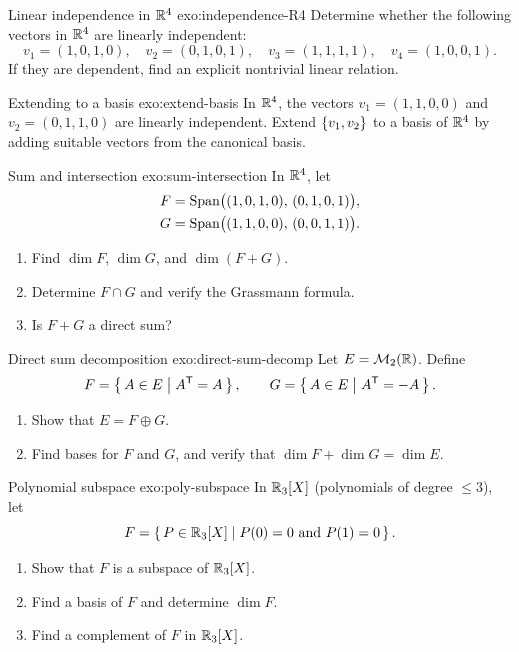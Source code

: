 \begin{exercise}{Linear independence in ${\mathbb{R}}^4$ \basic}{exo:independence-R4}
Determine whether the following vectors in ${\mathbb{R}}^4$ are linearly
independent:
\[
  v_1 = (1,0,1,0),\quad v_2 = (0,1,0,1),\quad v_3 = (1,1,1,1),\quad
  v_4 = (1,0,0,1).
\]
If they are dependent, find an explicit nontrivial linear relation.
\end{exercise}

\begin{exercise}{Extending to a basis \intermediate}{exo:extend-basis}
In ${\mathbb{R}}^4$, the vectors $v_1=(1,1,0,0)$ and $v_2=(0,1,1,0)$ are linearly
independent. Extend $\left\{v_1,v_2\right\}$ to a basis of ${\mathbb{R}}^4$ by adding
suitable vectors from the canonical basis.
\end{exercise}

\begin{exercise}{Sum and intersection \intermediate}{exo:sum-intersection}
In ${\mathbb{R}}^4$, let
\begin{align*}
  F &= \operatorname{Span}\bigl((1,0,1,0),\,(0,1,0,1)\bigr), \\
  G &= \operatorname{Span}\bigl((1,1,0,0),\,(0,0,1,1)\bigr).
\end{align*}
\begin{enumerate}[label=(\alph*)]
  \item Find $\dim F$, $\dim G$, and $\dim(F+G)$.
  \item Determine $F\cap G$ and verify the Grassmann formula.
  \item Is $F+G$ a direct sum?
\end{enumerate}
\end{exercise}

\begin{exercise}{Direct sum decomposition \intermediate}{exo:direct-sum-decomp}
Let $E = \mathcal{M}_2({\mathbb{R}})$. Define
\[
  F = \left\{\,A\in E\;\middle|\;{A}^{\mathsf{T}}=A\,\right\}, \qquad
  G = \left\{\,A\in E\;\middle|\;{A}^{\mathsf{T}}=-A\,\right\}.
\]
\begin{enumerate}[label=(\alph*)]
  \item Show that $E = F\oplus G$.
  \item Find bases for $F$ and $G$, and verify that
    $\dim F+\dim G=\dim E$.
\end{enumerate}
\end{exercise}

\begin{exercise}{Polynomial subspace \intermediate}{exo:poly-subspace}
In ${\mathbb{R}}_3[X]$ (polynomials of degree $\leq 3$), let
\[
  F = \left\{\,P\in{\mathbb{R}}_3[X]\;\middle|\;P(0)=0 \text{ and } P(1)=0\,\right\}.
\]
\begin{enumerate}[label=(\alph*)]
  \item Show that $F$ is a subspace of ${\mathbb{R}}_3[X]$.
  \item Find a basis of $F$ and determine $\dim F$.
  \item Find a complement of $F$ in ${\mathbb{R}}_3[X]$.
\end{enumerate}
\end{exercise}

